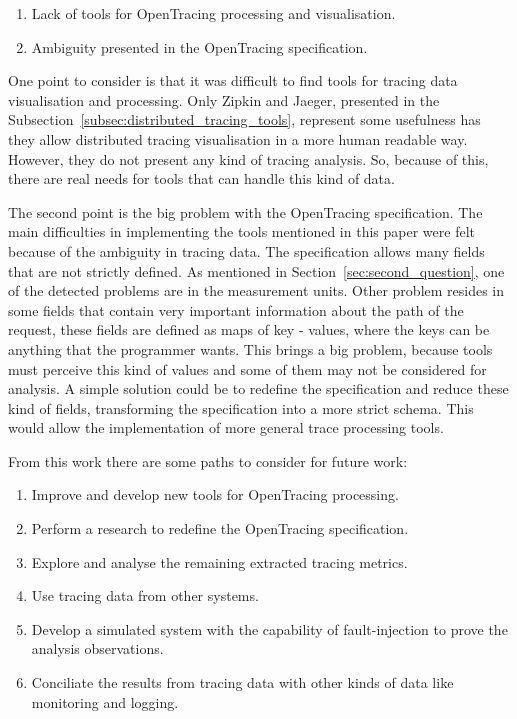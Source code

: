 \begin{enumerate}
    \item Lack of tools for OpenTracing processing and visualisation.
    \item Ambiguity presented in the OpenTracing specification.
\end{enumerate}

One point to consider is that it was difficult to find tools for tracing data visualisation and processing. Only Zipkin and Jaeger, presented in the Subsection~\ref{subsec:distributed_tracing_tools}, represent some usefulness has they allow distributed tracing visualisation in a more human readable way. However, they do not present any kind of tracing analysis. So, because of this, there are real needs for tools that can handle this kind of data.

The second point is the big problem with the OpenTracing specification. The main difficulties in implementing the tools mentioned in this paper were felt because of the ambiguity in tracing data. The specification allows many fields that are not strictly defined. As mentioned in Section~\ref{sec:second_question}, one of the detected problems are in the measurement units. Other problem resides in some fields that contain very important information about the path of the request, these fields are defined as maps of key - values, where the keys can be anything that the programmer wants. This brings a big problem, because tools must perceive this kind of values and some of them may not be considered for analysis. A simple solution could be to redefine the specification and reduce these kind of fields, transforming the specification into a more strict schema. This would allow the implementation of more general trace processing tools.


From this work there are some paths to consider for future work:

\begin{enumerate}
    \item Improve and develop new tools for OpenTracing processing.
    \item Perform a research to redefine the OpenTracing specification. 
    \item Explore and analyse the remaining extracted tracing metrics.
    \item Use tracing data from other systems.
    \item Develop a simulated system with the capability of fault-injection to prove the analysis observations.
    \item Conciliate the results from tracing data with other kinds of data like monitoring and logging.
\end{enumerate}

